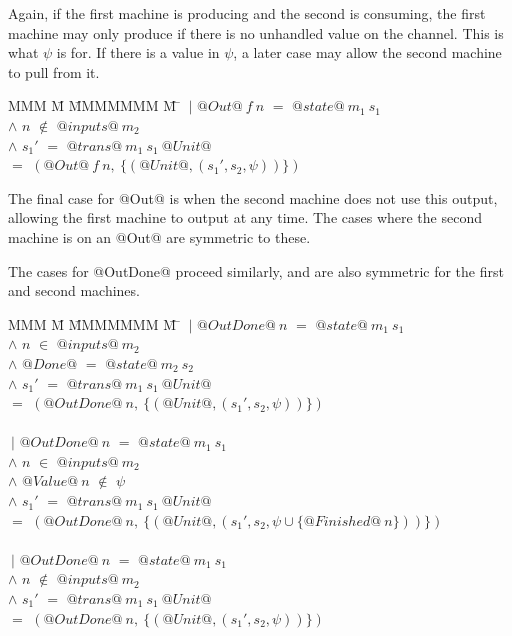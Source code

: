 Again, if the first machine is producing and the second is consuming, the first machine may only produce if there is no unhandled value on the channel.
This is what $\psi$ is for.
If there is a value in $\psi$, a later case may allow the second machine to pull from it.

\begin{tabbing}
MMM \= M \= MMMMMMM \= M \=\kill
 \> $~|$ \> $@Out@~f~n$ \> $=$ \> $@state@~m_1~s_1$ \\
 \> $\wedge$ \> $n$      \> $\not\in$ \> $@inputs@~m_2$ \\
 \> $\wedge$ \> $s_1'$     \> $=$ \> $@trans@~m_1~s_1~@Unit@$ \\
 \> $=$ \> $(@Out@~f~n,~\{(@Unit@, (s_1',s_2,\psi))\})$ \\
\end{tabbing}

The final case for @Out@ is when the second machine does not use this output, allowing the first machine to output at any time.
The cases where the second machine is on an @Out@ are symmetric to these.

The cases for @OutDone@ proceed similarly, and are also symmetric for the first and second machines.

\begin{tabbing}
MMM \= M \= MMMMMMM \= M \=\kill
 \> $~|$ \> $@OutDone@~n$ \> $=$ \> $@state@~m_1~s_1$ \\
 \> $\wedge$ \> $n$      \> $\in$ \> $@inputs@~m_2$ \\
 \> $\wedge$ \> $@Done@$ \> $=$ \> $@state@~m_2~s_2$ \\
 \> $\wedge$ \> $s_1'$     \> $=$ \> $@trans@~m_1~s_1~@Unit@$ \\
 \> $=$ \> $(@OutDone@~n,~\{(@Unit@, (s_1',s_2,\psi))\})$ \\
 \\
 \> $~|$ \> $@OutDone@~n$ \> $=$ \> $@state@~m_1~s_1$ \\
 \> $\wedge$ \> $n$      \> $\in$ \> $@inputs@~m_2$ \\
 \> $\wedge$ \> $@Value@~n$ \> $\not\in$ \> $\psi$ \\
 \> $\wedge$ \> $s_1'$     \> $=$ \> $@trans@~m_1~s_1~@Unit@$ \\
 \> $=$ \> $(@OutDone@~n,~\{(@Unit@, (s_1',s_2,\psi \cup \{@Finished@~n\}))\})$ \\
 \\
 \> $~|$ \> $@OutDone@~n$ \> $=$ \> $@state@~m_1~s_1$ \\
 \> $\wedge$ \> $n$      \> $\not\in$ \> $@inputs@~m_2$ \\
 \> $\wedge$ \> $s_1'$     \> $=$ \> $@trans@~m_1~s_1~@Unit@$ \\
 \> $=$ \> $(@OutDone@~n,~\{(@Unit@, (s_1',s_2,\psi))\})$ \\
\end{tabbing}

